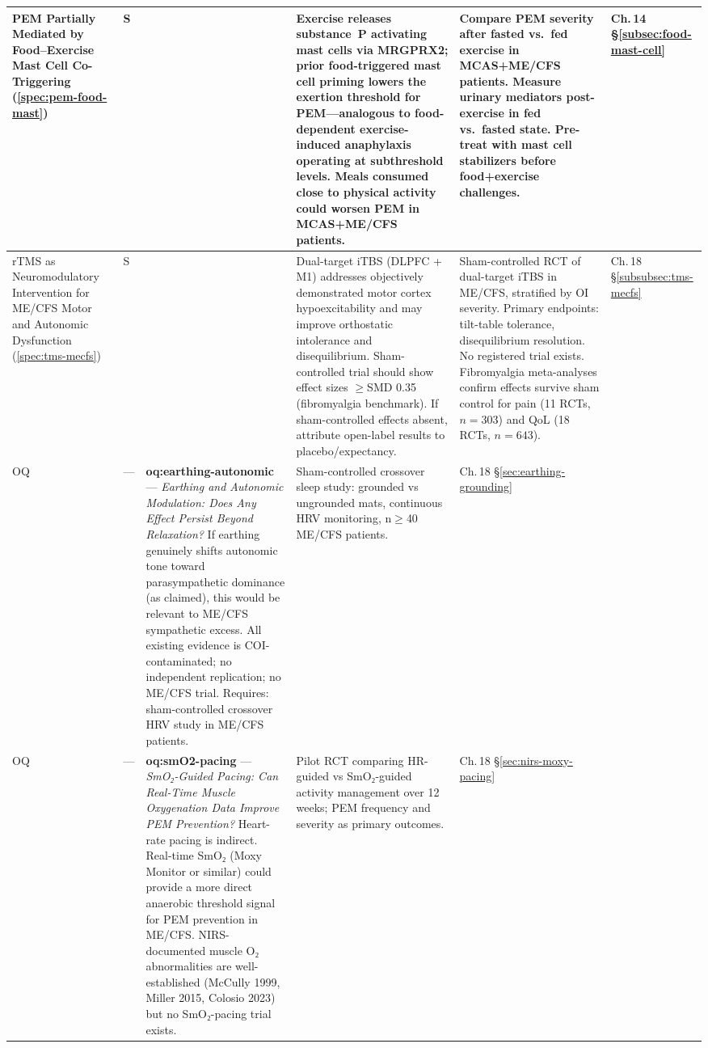 \begin{longtable}{%
  p{3.0cm}
  >{\centering\arraybackslash}p{0.55cm}
  >{\centering\arraybackslash}p{1.0cm}
  p{3.8cm}
  p{3.8cm}
  p{2.2cm}
}
\hline
PEM Partially Mediated by Food--Exercise Mast Cell Co-Triggering
(\ref{spec:pem-food-mast})
& S & 0.25 &
Exercise releases substance~P activating mast cells via MRGPRX2; prior food-triggered
mast cell priming lowers the exertion threshold for PEM---analogous to food-dependent
exercise-induced anaphylaxis operating at subthreshold levels. Meals consumed close
to physical activity could worsen PEM in MCAS+ME/CFS patients.
&
Compare PEM severity after fasted vs.\ fed exercise in MCAS+ME/CFS patients.
Measure urinary mediators post-exercise in fed vs.\ fasted state. Pre-treat with
mast cell stabilizers before food+exercise challenges.
&
Ch.\,14 \S\ref{subsec:food-mast-cell} \\[6pt]

\hline
rTMS as Neuromodulatory Intervention for ME/CFS Motor and Autonomic Dysfunction
(\ref{spec:tms-mecfs})
& S & 0.30 &
Dual-target iTBS (DLPFC + M1) addresses objectively demonstrated motor cortex
hypoexcitability and may improve orthostatic intolerance and disequilibrium.
Sham-controlled trial should show effect sizes $\geq$SMD 0.35 (fibromyalgia benchmark).
If sham-controlled effects absent, attribute open-label results to placebo/expectancy.
&
Sham-controlled RCT of dual-target iTBS in ME/CFS, stratified by OI severity.
Primary endpoints: tilt-table tolerance, disequilibrium resolution. No registered
trial exists. Fibromyalgia meta-analyses confirm effects survive sham control for
pain (11 RCTs, $n=303$) and QoL (18 RCTs, $n=643$).
&
Ch.\,18 \S\ref{subsubsec:tms-mecfs} \\[6pt]


\hline
OQ & --- &
\textbf{oq:earthing-autonomic} --- \emph{Earthing and Autonomic Modulation: Does Any Effect Persist Beyond Relaxation?}
If earthing genuinely shifts autonomic tone toward parasympathetic dominance (as claimed), this would be relevant to ME/CFS sympathetic excess. All existing evidence is COI-contaminated; no independent replication; no ME/CFS trial. Requires: sham-controlled crossover HRV study in ME/CFS patients.
&
Sham-controlled crossover sleep study: grounded vs ungrounded mats, continuous HRV monitoring, n$\geq$40 ME/CFS patients.
&
Ch.\,18 \S\ref{sec:earthing-grounding} \\[6pt]

\hline
OQ & --- &
\textbf{oq:smO2-pacing} --- \emph{SmO₂-Guided Pacing: Can Real-Time Muscle Oxygenation Data Improve PEM Prevention?}
Heart-rate pacing is indirect. Real-time SmO₂ (Moxy Monitor or similar) could provide a more direct anaerobic threshold signal for PEM prevention in ME/CFS. NIRS-documented muscle O₂ abnormalities are well-established (McCully 1999, Miller 2015, Colosio 2023) but no SmO₂-pacing trial exists.
&
Pilot RCT comparing HR-guided vs SmO₂-guided activity management over 12 weeks; PEM frequency and severity as primary outcomes.
&
Ch.\,18 \S\ref{sec:nirs-moxy-pacing} \\[6pt]


\end{longtable}
